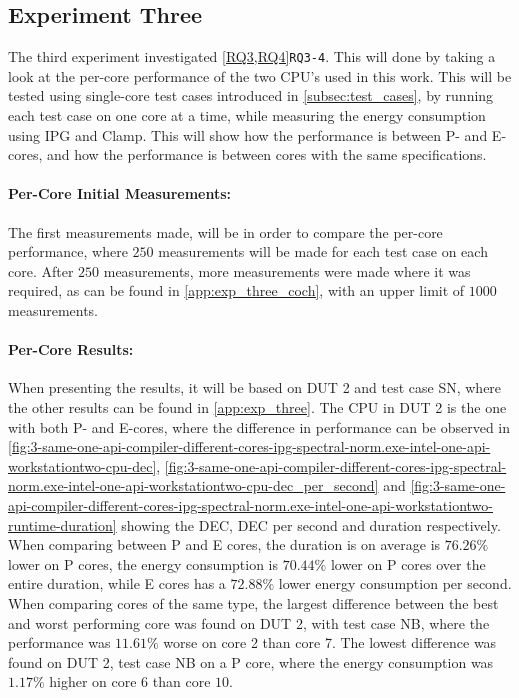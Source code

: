 \subsection{Experiment Three}\label{subsec:exp_three}

The third experiment investigated \cref{RQ3,RQ4}\texttt{RQ3-4}. This will done by taking a look at the per-core performance of the two CPU's used in this work. This will be tested using single-core test cases introduced in \cref{subsec:test_cases}, by running each test case on one core at a time, while measuring the energy consumption using IPG and Clamp. This will show how the performance is between P- and E-cores, and how the performance is between cores with the same specifications.

\paragraph{Per-Core Initial Measurements:} The first measurements made, will be in order to compare the per-core performance, where $250$ measurements will be made for each test case on each core. After $250$ measurements, more measurements were made where it was required, as can be found in \cref{app:exp_three_coch}, with an upper limit of $1000$ measurements.

\paragraph{Per-Core Results:} When presenting the results, it will be based on DUT 2 and test case SN, where the other results can be found in \cref{app:exp_three}. The CPU in DUT 2 is the one with both P- and E-cores, where the difference in performance can be observed in \cref{fig:3-same-one-api-compiler-different-cores-ipg-spectral-norm.exe-intel-one-api-workstationtwo-cpu-dec}, \cref{fig:3-same-one-api-compiler-different-cores-ipg-spectral-norm.exe-intel-one-api-workstationtwo-cpu-dec_per_second} and \cref{fig:3-same-one-api-compiler-different-cores-ipg-spectral-norm.exe-intel-one-api-workstationtwo-runtime-duration} showing the DEC, DEC per second and duration respectively. When comparing between P and E cores, the duration is on average is $76.26\%$ lower on P cores, the energy consumption is $70.44\%$ lower on P cores over the entire duration, while E cores has a $72.88\%$ lower energy consumption per second. When comparing cores of the same type, the largest difference between the best and worst performing core was found on DUT 2, with test case NB, where the performance was $11.61\%$ worse on core 2 than core 7. The lowest difference  was found on DUT 2, test case NB on a P core, where the energy consumption was $1.17\%$ higher on core $6$ than core $10$.






